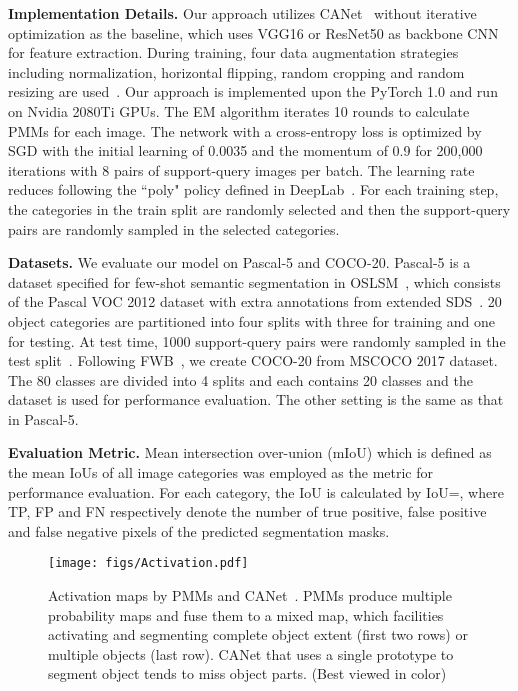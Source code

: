 \documentclass[runningheads]{llncs}
\begin{document}
\textbf{Implementation Details.}
Our approach utilizes CANet~\cite{CaNet} without iterative optimization as the baseline, which uses VGG16 or ResNet50 as backbone CNN for feature extraction. During training, four data augmentation strategies including normalization, horizontal flipping, random cropping and random resizing are used~\cite{CaNet}. Our approach is implemented upon the PyTorch 1.0 and run on Nvidia 2080Ti GPUs. 
The EM algorithm iterates 10 rounds to calculate PMMs for each image.
The network with a cross-entropy loss is optimized by SGD with the initial learning of 0.0035 and the momentum of 0.9 for 200,000 iterations with 8 pairs of support-query images per batch. The learning rate reduces following the ``poly" policy defined in DeepLab~\cite{DeepLabV2}. For each training step, the categories in the train split are randomly selected and then the support-query pairs are randomly sampled in the selected categories.

\textbf{Datasets.} 
We evaluate our model on Pascal-5 and COCO-20.
Pascal-5 is a dataset specified for few-shot semantic segmentation in OSLSM~\cite{OSLSM}, which consists of the Pascal VOC 2012 dataset with extra annotations from extended SDS~\cite{SDS11}. 20 object categories are partitioned into four splits with three for training and one for testing. At test time, 1000 support-query pairs were randomly sampled in the test split~\cite{CaNet}. Following FWB~\cite{FWB-ICCV2019}, we create COCO-20 from MSCOCO 2017 dataset. The 80 classes are divided into 4 splits and each contains 20 classes and the  dataset is used for performance evaluation. The other setting is the same as that in Pascal-5.


\textbf{Evaluation Metric.}
Mean intersection over-union (mIoU) which is defined as the mean IoUs of all image categories was employed as the metric for performance evaluation. For each category, the IoU is calculated by IoU=, where TP, FP and FN respectively denote the number of true positive, false positive and false negative pixels of the predicted segmentation masks. 


\begin{figure}[t]
\centering
\texttt{[image: figs/Activation.pdf]}
\caption{Activation maps by PMMs and CANet~\cite{CaNet}. PMMs produce multiple probability maps and fuse them to a mixed map, which facilities activating and segmenting complete object extent (first two rows) or multiple objects (last row). CANet that uses a single prototype to segment object tends to miss object parts. (Best viewed in color)}
\label{fig:prob_map}
\vspace{-0.2cm}
\end{figure}
\end{document}
